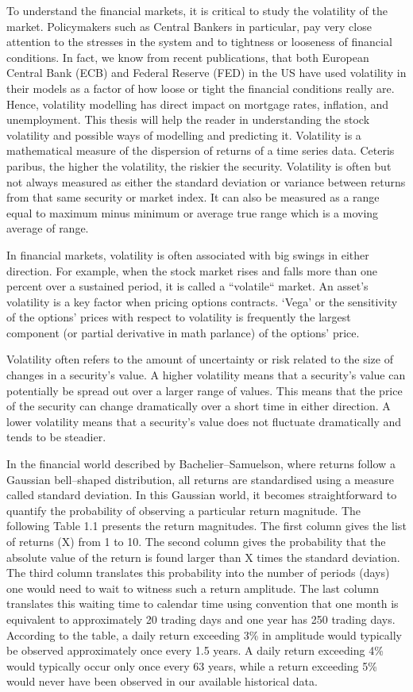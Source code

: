 \documentclass[12pt,a4paper]{report}
\numberwithin{equation}{section}
\begin{document}
To understand the financial markets, it is critical to study the
volatility of the market. Policymakers such as Central Bankers in
particular, pay very close attention to the stresses in the system and
to tightness or looseness of financial conditions. In fact, we know from
recent publications, that both European Central Bank (ECB) and Federal
Reserve (FED) in the US have used volatility in their models as a factor
of how loose or tight the financial conditions really are. Hence,
volatility modelling has direct impact on mortgage rates, inflation, and
unemployment. This thesis will help the reader in understanding the
stock volatility and possible ways of modelling and predicting it.
Volatility is a mathematical measure of the dispersion of returns of a
time series data. Ceteris paribus, the higher the volatility, the
riskier the security. Volatility is often but not always measured as
either the standard deviation or variance between returns from that same
security or market index. It can also be measured as a range equal to
maximum minus minimum or average true range which is a moving average of
range.

In financial markets, volatility is often associated with big swings in
either direction. For example, when the stock market rises and falls
more than one percent over a sustained period, it is called a ``volatile``
market. An asset's volatility is a key factor when pricing options
contracts. `Vega' or the sensitivity of the options' prices with respect
to volatility is frequently the largest component (or partial derivative
in math parlance) of the options' price.

Volatility often refers to the amount of uncertainty or risk related to
the size of changes in a security's value. A higher volatility means
that a security's value can potentially be spread out over a larger
range of values. This means that the price of the security can change
dramatically over a short time in either direction. A lower volatility
means that a security's value does not fluctuate dramatically and tends
to be steadier.

In the financial world described by Bachelier--Samuelson, where returns
follow a Gaussian bell--shaped distribution, all returns are standardised
using a measure called standard deviation. In this Gaussian world, it
becomes straightforward to quantify the probability of observing a
particular return magnitude. The following Table 1.1 presents the return
magnitudes. The first column gives the list of returns (X) from 1 to 10.
The second column gives the probability that the absolute value of the
return is found larger than X times the standard deviation. The third
column translates this probability into the number of periods (days) one
would need to wait to witness such a return amplitude. The last column
translates this waiting time to calendar time using convention that one
month is equivalent to approximately 20 trading days and one year has
250 trading days. According to the table, a daily return exceeding 3\%
in amplitude would typically be observed approximately once every 1.5
years. A daily return exceeding 4\% would typically occur only once
every 63 years, while a return exceeding 5\% would never have been
observed in our available historical data.
\end{document}
